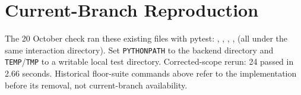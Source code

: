 \section{Current-Branch Reproduction}
The 20 October check ran these existing files with pytest: , , , ,  (all under the same interaction directory). Set \texttt{PYTHONPATH} to the backend directory and \texttt{TEMP}/\texttt{TMP} to a writable local test directory. Corrected-scope rerun: 24 passed in 2.66 seconds. Historical floor-suite commands above refer to the implementation before its removal, not current-branch availability.
